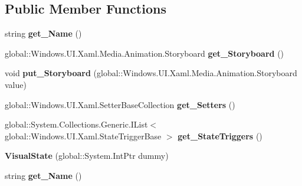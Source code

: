 \subsection*{Public Member Functions}
\begin{DoxyCompactItemize}
\item 
\mbox{\label{class_windows_1_1_u_i_1_1_xaml_1_1_visual_state_a879a468f5014b12ff6c4d57ff0f58a5b}} 
string {\bfseries get\+\_\+\+Name} ()
\item 
\mbox{\label{class_windows_1_1_u_i_1_1_xaml_1_1_visual_state_a6b5d43fae9eab67c703b75086a08b538}} 
global\+::\+Windows.\+U\+I.\+Xaml.\+Media.\+Animation.\+Storyboard {\bfseries get\+\_\+\+Storyboard} ()
\item 
\mbox{\label{class_windows_1_1_u_i_1_1_xaml_1_1_visual_state_a3b834606f339f18853900acbdc0871b8}} 
void {\bfseries put\+\_\+\+Storyboard} (global\+::\+Windows.\+U\+I.\+Xaml.\+Media.\+Animation.\+Storyboard value)
\item 
\mbox{\label{class_windows_1_1_u_i_1_1_xaml_1_1_visual_state_ac81aee782cc1e2a4470e9847716cafa0}} 
global\+::\+Windows.\+U\+I.\+Xaml.\+Setter\+Base\+Collection {\bfseries get\+\_\+\+Setters} ()
\item 
\mbox{\label{class_windows_1_1_u_i_1_1_xaml_1_1_visual_state_a27eb2311db04fa8c2a18edac2aa49be9}} 
global\+::\+System.\+Collections.\+Generic.\+I\+List$<$ global\+::\+Windows.\+U\+I.\+Xaml.\+State\+Trigger\+Base $>$ {\bfseries get\+\_\+\+State\+Triggers} ()
\item 
\mbox{\label{class_windows_1_1_u_i_1_1_xaml_1_1_visual_state_a2c46a539387b55802a381e56d280a8ae}} 
{\bfseries Visual\+State} (global\+::\+System.\+Int\+Ptr dummy)
\item 
\mbox{\label{class_windows_1_1_u_i_1_1_xaml_1_1_visual_state_a879a468f5014b12ff6c4d57ff0f58a5b}} 
string {\bfseries get\+\_\+\+Name} ()
\item 

\end{DoxyCompactItemize}
